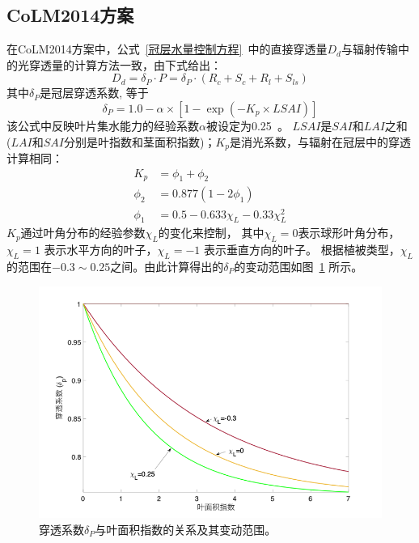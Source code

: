 \subsection{CoLM2014方案}
在CoLM2014方案中，公式~\ref{冠层水量控制方程}~中的直接穿透量$D_d$与辐射传输中的光穿透量的计算方法一致，由下式给出：
\begin{equation}
D_{d}=\delta_{P} \cdot P=\delta_{P} \cdot\left(R_{c}+S_{c}+R_{l}+S_{l s}\right)
\end{equation}
其中$\delta_P$是冠层穿透系数, 等于
\begin{equation}
\delta_{P}=1.0-\alpha \times\left[1-\exp \left(-K_{p} \times LSAI\right)\right]
\end{equation}
该公式中反映叶片集水能力的经验系数$\alpha$被设定为0.25~\citep{lawrence2011parameterization}。
$LSAI$是$SAI$和$LAI$之和 ($LAI$和$SAI$分别是叶指数和茎面积指数)；$K_p$是消光系数，与辐射在冠层中的穿透计算相同：
\begin{equation}\label{Eq:消光系数}
\begin{aligned}
K_{p} &= \phi_{1}+\phi_{2} \\
\phi_{2} &= 0.877\left(1-2 \phi_{1}\right) \\
\phi_{1} &= 0.5-0.633 \chi_{L}-0.33 \chi_{L}^{2}
\end{aligned}
\end{equation}
$K_p$通过叶角分布的经验参数$\chi_L$的变化来控制，
其中$\chi_L=0$表示球形叶角分布，$\chi_L= 1$ 表示水平方向的叶子，$\chi_L= -1$ 表示垂直方向的叶子。
根据植被类型，$\chi_L$的范围在$-0.3\sim0.25$之间。由此计算得出的$\delta_P$的变动范围如图~\ref{fig:穿透系数与叶面积指数} 所示。%
{
\begin{figure}[htbp]
\centering
\includegraphics{Figures/陆地表面的水分循环/穿透系数与叶面积指数.png}
\caption{穿透系数$\delta_P$与叶面积指数的关系及其变动范围。}
\label{fig:穿透系数与叶面积指数}
\end{figure}
}

